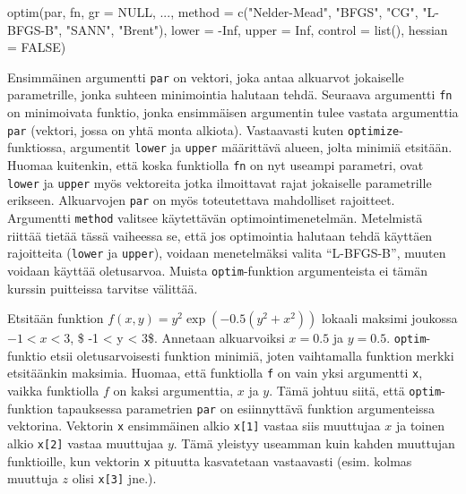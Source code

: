 \documentclass[
]{book}
\newenvironment{Shaded}{\begin{snugshade}}{\end{snugshade}}
\newcommand{\AttributeTok}[1]{\textcolor[rgb]{0.77,0.63,0.00}{#1}}
\newcommand{\ConstantTok}[1]{\textcolor[rgb]{0.00,0.00,0.00}{#1}}
\newcommand{\FunctionTok}[1]{\textcolor[rgb]{0.00,0.00,0.00}{#1}}
\newcommand{\NormalTok}[1]{#1}
\newcommand{\SpecialCharTok}[1]{\textcolor[rgb]{0.00,0.00,0.00}{#1}}
\newcommand{\StringTok}[1]{\textcolor[rgb]{0.31,0.60,0.02}{#1}}
\begin{document}
\begin{Shaded}
\begin{Highlighting}[]
\FunctionTok{optim}\NormalTok{(par, fn, }\AttributeTok{gr =} \ConstantTok{NULL}\NormalTok{, ...,}
      \AttributeTok{method =} \FunctionTok{c}\NormalTok{(}\StringTok{"Nelder{-}Mead"}\NormalTok{, }\StringTok{"BFGS"}\NormalTok{, }\StringTok{"CG"}\NormalTok{, }\StringTok{"L{-}BFGS{-}B"}\NormalTok{, }\StringTok{"SANN"}\NormalTok{,}
                 \StringTok{"Brent"}\NormalTok{),}
      \AttributeTok{lower =} \SpecialCharTok{{-}}\ConstantTok{Inf}\NormalTok{, }\AttributeTok{upper =} \ConstantTok{Inf}\NormalTok{,}
      \AttributeTok{control =} \FunctionTok{list}\NormalTok{(), }\AttributeTok{hessian =} \ConstantTok{FALSE}\NormalTok{)}
\end{Highlighting}
\end{Shaded}

Ensimmäinen argumentti \texttt{par} on vektori, joka antaa alkuarvot jokaiselle parametrille, jonka suhteen minimointia halutaan tehdä. Seuraava argumentti \texttt{fn} on minimoivata funktio, jonka ensimmäisen argumentin tulee vastata argumenttia \texttt{par} (vektori, jossa on yhtä monta alkiota). Vastaavasti kuten \texttt{optimize}-funktiossa, argumentit \texttt{lower} ja \texttt{upper} määrittävä alueen, jolta minimiä etsitään. Huomaa kuitenkin, että koska funktiolla \texttt{fn} on nyt useampi parametri, ovat \texttt{lower} ja \texttt{upper} myös vektoreita jotka ilmoittavat rajat jokaiselle parametrille erikseen. Alkuarvojen \texttt{par} on myös toteutettava mahdolliset rajoitteet. Argumentti \texttt{method} valitsee käytettävän optimointimenetelmän. Metelmistä riittää tietää tässä vaiheessa se, että jos optimointia halutaan tehdä käyttäen rajoitteita (\texttt{lower} ja \texttt{upper}), voidaan menetelmäksi valita ``L-BFGS-B'', muuten voidaan käyttää oletusarvoa. Muista \texttt{optim}-funktion argumenteista ei tämän kurssin puitteissa tarvitse välittää.

Etsitään funktion \(f(x,y) = y^2\exp(-0.5(y^2+x^2))\) lokaali maksimi joukossa \(-1 < x < 3\), \$ -1 \textless{} y \textless{} 3\$. Annetaan alkuarvoiksi \(x = 0.5\) ja \(y = 0.5\). \texttt{optim}-funktio etsii oletusarvoisesti funktion minimiä, joten vaihtamalla funktion merkki etsitäänkin maksimia. Huomaa, että funktiolla \texttt{f} on vain yksi argumentti \texttt{x}, vaikka funktiolla \(f\) on kaksi argumenttia, \(x\) ja \(y\). Tämä johtuu siitä, että \texttt{optim}-funktion tapauksessa parametrien \texttt{par} on esiinnyttävä funktion argumenteissa vektorina. Vektorin \texttt{x} ensimmäinen alkio \texttt{x{[}1{]}} vastaa siis muuttujaa \(x\) ja toinen alkio \texttt{x{[}2{]}} vastaa muuttujaa \(y\). Tämä yleistyy useamman kuin kahden muuttujan funktioille, kun vektorin \texttt{x} pituutta kasvatetaan vastaavasti (esim. kolmas muuttuja \(z\) olisi \texttt{x{[}3{]}} jne.).
\end{document}
